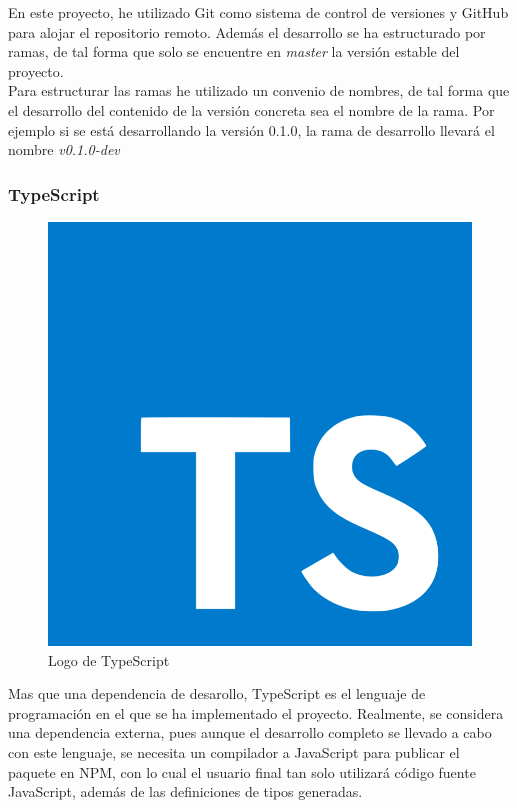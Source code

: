 En este proyecto, he utilizado Git \cite{git} como sistema de control de versiones y GitHub \cite{github} para alojar el repositorio remoto. Además el desarrollo se ha estructurado por ramas, de tal forma que solo se encuentre en \textit{master} la versión estable del proyecto. \\

Para estructurar las ramas he utilizado un convenio de nombres, de tal forma que el desarrollo del contenido de la versión concreta sea el nombre de la rama. Por ejemplo si se está desarrollando la versión 0.1.0, la rama de desarrollo llevará el nombre \textit{v0.1.0-dev}

\subsubsection{TypeScript}

\begin{figure}[ht]
    \centering
    \includegraphics[scale=0.1]{mem/images/cap-4/4.1.2(desarrollo)/typescript-logo.png}
    \caption{Logo de TypeScript}
    \label{fig:typescript}
\end{figure}
 
 Mas que una dependencia de desarollo, TypeScript es el lenguaje de programación en el que se ha implementado el proyecto. Realmente, se considera una dependencia externa, pues aunque el desarrollo completo se llevado a cabo con este lenguaje, se necesita un compilador a JavaScript para publicar el paquete en NPM, con lo cual el usuario final tan solo utilizará código fuente JavaScript, además de las definiciones de tipos generadas. \\
 
